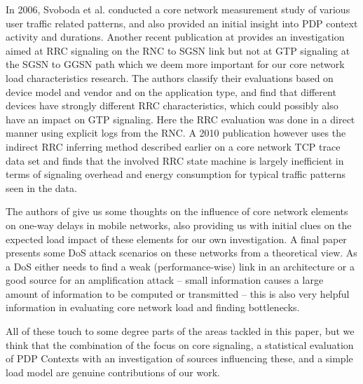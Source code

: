 In 2006, Svoboda et al. \cite{svoboda2006composition} conducted a core network measurement study of various user traffic related patterns, and also provided an initial insight into \ac{PDP} context activity and durations. Another recent publication at \cite{he2012panoramic} provides an investigation aimed at \ac{RRC} signaling on the \ac{RNC} to \ac{SGSN} link but not at \ac{GTP} signaling at the \ac{SGSN} to \ac{GGSN} path which we deem more important for our core network load characteristics research. The authors classify their evaluations based on device model and vendor and on the application type, and find that different devices have strongly different \ac{RRC} characteristics, which could possibly also have an impact on \ac{GTP} signaling. Here the \ac{RRC} evaluation was done in a direct manner using explicit logs from the \ac{RNC}. A 2010 publication\cite{Qian:2010:CRR:1879141.1879159} however uses the indirect \ac{RRC} inferring method described earlier on a core network TCP trace data set and finds that the involved \ac{RRC} state machine is largely inefficient in terms of signaling overhead and energy consumption for typical traffic patterns seen in the data.

The authors of \cite{4675847} give us some thoughts on the influence of core network elements on one-way delays in mobile networks, also providing us with initial clues on the expected load impact of these elements for our own investigation. A final paper \cite{Ricciato2010551} presents some \ac{DoS} attack scenarios on these networks from a theoretical view. As a \ac{DoS} either needs to find a weak (performance-wise) link in an architecture or a good source for an amplification attack -- small information causes a large amount of information to be computed or transmitted -- this is also very helpful information in evaluating core network load and finding bottlenecks.

All of these touch to some degree parts of the areas tackled in this paper, but we think that the combination of the focus on core signaling, a statistical evaluation of PDP Contexts with an investigation of sources influencing these, and a simple load model are genuine contributions of our work.



